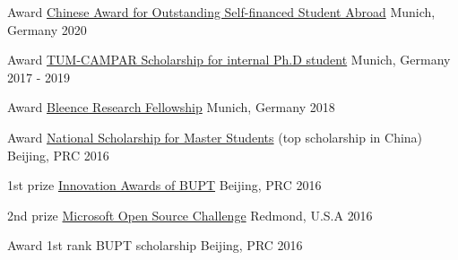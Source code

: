 




\begin{cvhonors}

\cvhonor
{Award} %
{\href{}{Chinese Award for Outstanding Self-financed Student Abroad} } %
{Munich, Germany} %
{2020} %

\cvhonor
{Award} %
{\href{}{TUM-CAMPAR Scholarship for internal Ph.D student} } %
{Munich, Germany} %
{2017 - 2019} %

\cvhonor
{Award} %
{\href{https://bleenco.com/}{Bleence Research Fellowship} } %
{Munich, Germany} %
{2018} %

\cvhonor
{Award} %
{\href{http://sice.bupt.edu.cn/info/1008/1546.htm}{National Scholarship for Master Students} (top scholarship in China)} %
{Beijing, PRC} %
{2016} %

\cvhonor
{1st prize} %
{\href{http://my.bupt.edu.cn/detach.portal?.pmn=view&action=browser&.ia=false&.pen=pe1144&bulletinId=fc089be9-6d81-11e6-ae27-4f4915a784ea}{Innovation Awards of BUPT}} %
{Beijing, PRC} %
{2016} %


\cvhonor
{2nd prize} %
{\href{https://www.microsoft.com/en-us/research/academic-program/microsoft-open-source-challenge/}{Microsoft Open Source Challenge}} %
{Redmond, U.S.A} %
{2016} %


\cvhonor
{Award} %
{1st rank BUPT scholarship} %
{Beijing, PRC} %
{2016} %


\end{cvhonors}

